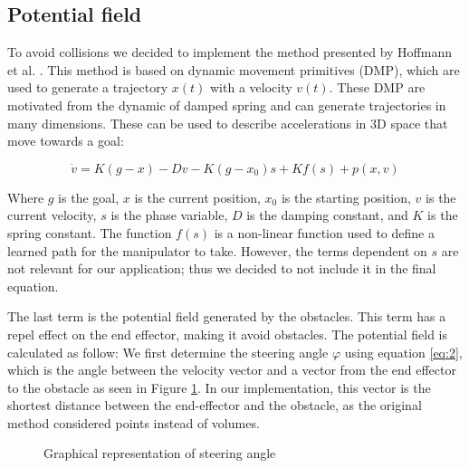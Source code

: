 \documentclass[a4paper, 10pt, conference]{ieeeconf}      %
\begin{document}
\subsection{Potential field} %

To avoid collisions we decided to implement the method presented by Hoffmann et al. \cite{Hoffmann}. This method is based on dynamic movement primitives (DMP), which are used to generate a trajectory $x(t)$ with a velocity $v(t)$. These DMP are motivated from the dynamic of damped spring and can generate trajectories in many dimensions. These can be used to describe accelerations in 3D space that move towards a goal:

\begin{equation} \label{eq:1}
	\dot{v} = K ( g - x ) - D v - K (g - x_0) s + K f(s) + p(x, v)
\end{equation}

Where $g$ is the goal, $x$ is the current position, $x_0$ is the starting position, $v$ is the current velocity, $s$ is the phase variable, $D$ is the damping constant, and $K$ is the spring constant. The function $f(s)$ is a non-linear function used to define a learned path for the manipulator to take. However, the terms dependent on $s$ are not relevant for our application; thus we decided to not include it in the final equation.  

The last term is the potential field generated by the obstacles. This term has a repel effect on the end effector, making it avoid obstacles. The potential field is calculated as follow: We first determine the steering angle $\varphi$ using equation \ref{eq:2}, which is the angle between the velocity vector and a vector from the end effector to the obstacle as seen in Figure \ref{steering_image}. In our implementation, this vector is the shortest distance between the end-effector and the obstacle, as the original method considered points instead of volumes.


\begin{figure}
	\centering
	\caption{Graphical representation of steering angle \cite{Hoffmann}}
	\label{steering_image}
\end{figure}
\end{document}
